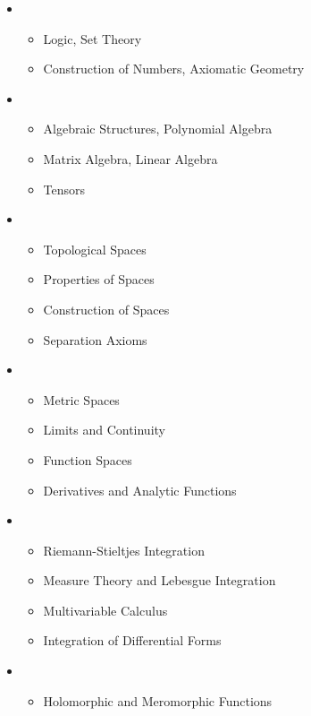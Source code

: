\begin{itemize}
    \item {}
    \begin{itemize}
        \item Logic, Set Theory
        \item Construction of Numbers, Axiomatic Geometry
    \end{itemize}
    \item {}
    \begin{itemize}
        \item Algebraic Structures, Polynomial Algebra
        \item Matrix Algebra, Linear Algebra
        \item Tensors
    \end{itemize}
    \item {}
    \begin{itemize}
        \item Topological Spaces
        \item Properties of Spaces
        \item Construction of Spaces
        \item Separation Axioms
    \end{itemize}
    \item {}
    \begin{itemize}
        \item Metric Spaces
        \item Limits and Continuity
        \item Function Spaces
        \item Derivatives and Analytic Functions
    \end{itemize}
    \item {}
    \begin{itemize}
        \item Riemann-Stieltjes Integration
        \item Measure Theory and Lebesgue Integration
        \item Multivariable Calculus
        \item Integration of Differential Forms
    \end{itemize}
    \item {}
    \begin{itemize}
        \item Holomorphic and Meromorphic Functions

\end{itemize}
\end{itemize}
